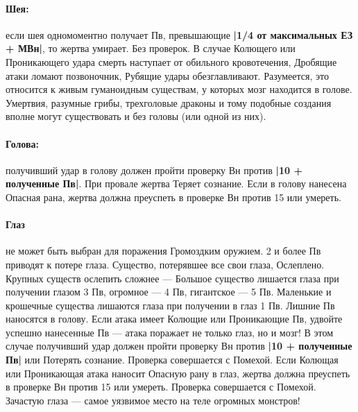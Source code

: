 \paragraph{Шея:} если шея одномоментно получает Пв, превышающие \textbf{|1/4 от максимальных ЕЗ + МВн|}, то жертва умирает. Без проверок. В случае Колющего или Проникающего удара смерть наступает от обильного кровотечения, Дробящие атаки ломают позвоночник, Рубящие удары обезглавливают.
\newline
Разумеется, это относится к живым гуманоидным существам, у которых мозг находится в голове. Умертвия, разумные грибы, трехголовые драконы и тому подобные создания вполне могут существовать и без головы (или одной из них).
\paragraph{Голова:} получивший удар в голову должен пройти проверку Вн против \textbf{|10 + полученные Пв|}. При провале жертва Теряет сознание. Если в голову нанесена Опасная рана, жертва должна преуспеть в проверке Вн против 15 или умереть.
\paragraph{Глаз} не может быть выбран для поражения Громоздким оружием. 2 и более Пв приводят к потере глаза. Существо, потерявшее все свои глаза, Ослеплено. Крупных существ ослепить сложнее — Большое существо лишается глаза при получении глазом 3 Пв, огромное — 4 Пв, гигантское — 5 Пв. Маленькие и крошечные существа лишаются глаза при получении в глаз 1 Пв. Лишние Пв наносятся в голову.
\newline
Если атака имеет Колющие или Проникающие Пв, удвойте успешно нанесенные Пв — атака поражает не только глаз, но и мозг! В этом случае получивший удар должен пройти проверку Вн против \textbf{|10 + полученные Пв|} или Потерять сознание. Проверка совершается с Помехой.
\newline
Если Колющая или Проникающая атака наносит Опасную рану в глаз, жертва должна преуспеть в проверке Вн против 15 или умереть. Проверка совершается с Помехой.
\newline
Зачастую глаза — самое уязвимое место на теле огромных монстров!
